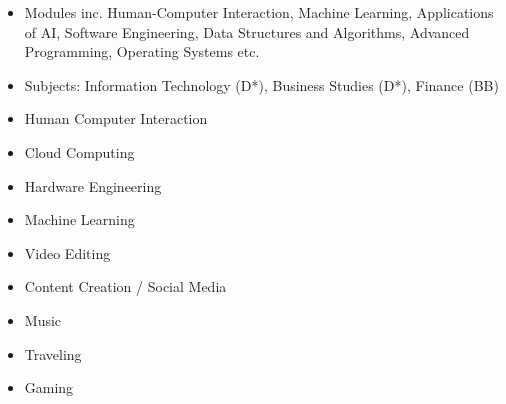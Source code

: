 
\begin{itemize}
    \item Modules inc. Human-Computer Interaction, Machine Learning, Applications of AI, Software Engineering, Data Structures and Algorithms, Advanced Programming,  Operating Systems etc.
\end{itemize}
{}
\begin{itemize}
    \item Subjects: Information Technology (D*), Business Studies (D*), Finance (BB)
\end{itemize}










\begin{itemize}
\item Human Computer Interaction
\item Cloud Computing
\item Hardware Engineering
\item Machine Learning
\item Video Editing
\end{itemize}
\smallskip
{}
\begin{itemize}
\item Content Creation / Social Media
\item Music
\item Traveling
\item Gaming
\end{itemize}



\smallskip
\smallskip

\clearpage

